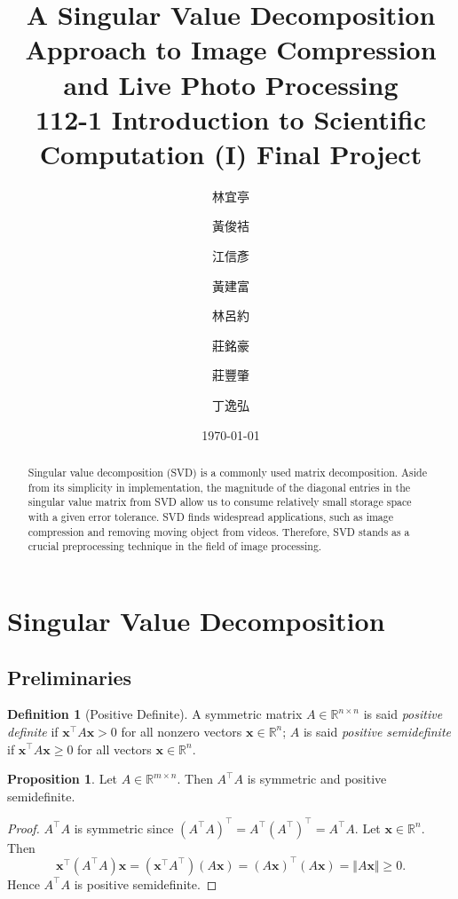 \documentclass[12pt]{article}
\theoremstyle{definition}
\newtheorem{definition}[theorem]{Definition}
\newtheorem{proposition}[theorem]{Proposition}
\begin{document}
\title{
    \Large A Singular Value Decomposition Approach to Image Compression and Live Photo Processing \\
    \large 112-1 Introduction to Scientific Computation (I) Final Project
}
\author{
    $\quad$林宜亭$\quad$ \and
    $\quad$黃俊袺$\quad$ \and
    $\quad$江信彥$\quad$ \and
    $\quad$黃建富$\quad$ \and
    $\quad$林呂約$\quad$ \and
    $\quad$莊銘豪$\quad$ \and
    $\quad$莊豐肇$\quad$ \and
    $\quad$丁逸弘$\quad$
}
\date{\today}
\maketitle
\begin{abstract}
    Singular value decomposition (SVD) is a commonly used matrix decomposition. Aside from its simplicity in implementation, the magnitude of the diagonal entries in the singular value matrix from SVD allow us to consume relatively small storage space with a given error tolerance. SVD finds widespread applications, such as image compression and removing moving object from videos. Therefore, SVD stands as a crucial preprocessing technique in the field of image processing.
\end{abstract}

\section{Singular Value Decomposition}
\subsection{Preliminaries}
\begin{definition}[Positive Definite] \label{def:positive_definite}
    A symmetric matrix $A\in \mathbb{R}^{n\times n}$ is said \textit{positive definite} if 
    $\mathbf{x}^\top A\mathbf{x}>0$ for all nonzero vectors $\mathbf{x}\in\mathbb{R}^n$; 
    $A$ is said \textit{positive semidefinite} if 
    $\mathbf{x}^\top A\mathbf{x}\geq 0$ for all vectors $\mathbf{x}\in\mathbb{R}^n$.
\end{definition}

\begin{proposition} \label{prop:preliminary_1}
    Let $A\in\mathbb{R}^{m\times n}$. Then $A^\top A$ is symmetric and positive semidefinite.
\end{proposition}
\begin{proof}
    $A^\top A$ is symmetric since $(A^\top A)^\top = A^\top (A^\top)^\top = A^\top A$. Let $\mathbf{x}\in\mathbb{R}^n$. Then
    \[ \mathbf{x}^\top(A^\top A)\mathbf{x}
    = (\mathbf{x}^\top A^\top)(A\mathbf{x})
    = (A\mathbf{x})^\top (A\mathbf{x})
    = \Vert A \mathbf{x}\Vert \geq 0.
    \]
    Hence $A^\top A$ is positive semidefinite.
\end{proof}
\end{document}
